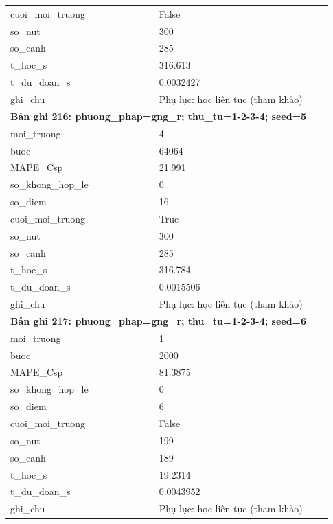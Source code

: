 \begin{longtable}{p{0.43\linewidth}p{0.50\linewidth}}
cuoi\_\allowbreak moi\_\allowbreak truong & False \\
so\_\allowbreak nut & 300 \\
so\_\allowbreak canh & 285 \\
t\_\allowbreak hoc\_\allowbreak s & 316.613 \\
t\_\allowbreak du\_\allowbreak doan\_\allowbreak s & 0.0032427 \\
ghi\_\allowbreak chu & Phụ lục: học liên tục (tham khảo) \\
\midrule
\multicolumn{2}{p{0.95\linewidth}}{\textbf{Bản ghi 216: phuong\_phap=gng\_r; thu\_tu=1-2-3-4; seed=5}} \\
moi\_\allowbreak truong & 4 \\
buoc & 64064 \\
MAPE\_\allowbreak Csp & 21.991 \\
so\_\allowbreak khong\_\allowbreak hop\_\allowbreak le & 0 \\
so\_\allowbreak diem & 16 \\
cuoi\_\allowbreak moi\_\allowbreak truong & True \\
so\_\allowbreak nut & 300 \\
so\_\allowbreak canh & 285 \\
t\_\allowbreak hoc\_\allowbreak s & 316.784 \\
t\_\allowbreak du\_\allowbreak doan\_\allowbreak s & 0.0015506 \\
ghi\_\allowbreak chu & Phụ lục: học liên tục (tham khảo) \\
\midrule
\multicolumn{2}{p{0.95\linewidth}}{\textbf{Bản ghi 217: phuong\_phap=gng\_r; thu\_tu=1-2-3-4; seed=6}} \\
moi\_\allowbreak truong & 1 \\
buoc & 2000 \\
MAPE\_\allowbreak Csp & 81.3875 \\
so\_\allowbreak khong\_\allowbreak hop\_\allowbreak le & 0 \\
so\_\allowbreak diem & 6 \\
cuoi\_\allowbreak moi\_\allowbreak truong & False \\
so\_\allowbreak nut & 199 \\
so\_\allowbreak canh & 189 \\
t\_\allowbreak hoc\_\allowbreak s & 19.2314 \\
t\_\allowbreak du\_\allowbreak doan\_\allowbreak s & 0.0043952 \\
ghi\_\allowbreak chu & Phụ lục: học liên tục (tham khảo) \\

\end{longtable}
